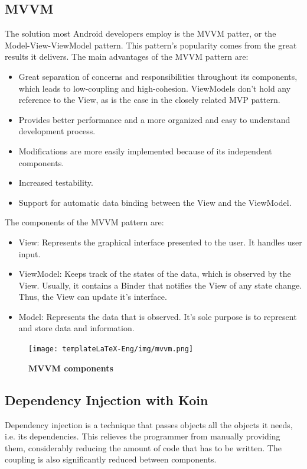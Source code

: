 \documentclass[12pt,a4paper,twoside]{report}
\begin{document}
\subsection{MVVM}
The solution most Android developers employ is the MVVM patter, or the Model-View-ViewModel pattern. This pattern's popularity comes from the great results it delivers. The main advantages of the MVVM pattern are:
\begin{itemize}
    \item Great separation of concerns and responsibilities throughout its components, which leads to low-coupling and high-cohesion. ViewModels don't hold any reference to the View, as is the case in the closely related MVP pattern.
    \item Provides better performance and a more organized and easy to understand development process.
    \item Modifications are more easily implemented because of its independent components.
    \item Increased testability.
    \item Support for automatic data binding between the View and the ViewModel.
\end{itemize}

\noindent The components of the MVVM pattern are:
\begin{itemize}
    \item View: Represents the graphical interface presented to the user. It handles user input.
    \item ViewModel: Keeps track of the states of the data, which is observed by the View. Usually, it contains a Binder that notifies the View of any state change. Thus, the View can update it's interface.
    \item Model: Represents the data that is observed. It's sole purpose is to represent and store data and information.
\end{itemize}

 \begin{figure}[H]
    \begin{center}
        \texttt{[image: templateLaTeX-Eng/img/mvvm.png]}
        \caption{\bf MVVM components\footnotemark}
    \end{center}
\end{figure}

\subsection{Dependency Injection with Koin}
Dependency injection is a technique that passes objects all the objects it needs, i.e. its dependencies. This relieves the programmer from manually providing them, considerably reducing the amount of code that has to be written. The coupling is also significantly reduced between components. 
\end{document}
